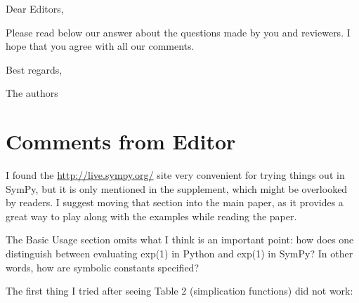 \documentclass[answers,12pt]{exam}
\begin{document}
Dear Editors, \bigskip

Please read below our answer about the
questions made by you and reviewers. I hope that you agree
with all our comments. \bigskip

Best regards,\bigskip

The authors

\pagebreak

\section{Comments from Editor}

\begin{questions}
\question I found the \url{http://live.sympy.org/} site very convenient for trying things
out in SymPy, but it is only mentioned in the supplement, which might be
overlooked by readers. I suggest moving that section into the main paper, as
it provides a great way to play along with the examples while reading the
paper.
\begin{solution}
\end{solution}
\question The Basic Usage section omits what I think is an important point:
how does one distinguish between evaluating exp(1) in Python and exp(1) in
SymPy? In other words, how are symbolic constants specified?
\begin{solution}
\end{solution}
\question The first
thing I tried after seeing Table 2 (simplication functions) did not work:


\end{questions}
\end{document}
